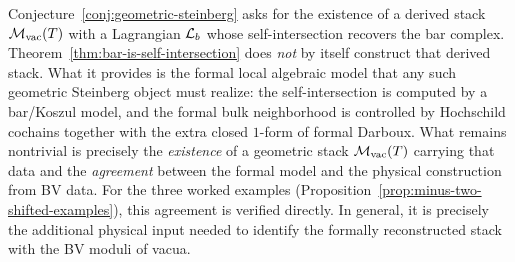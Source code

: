 \begin{remark}
\label{rem:conjecture-to-theorem}
Conjecture~\ref{conj:geometric-steinberg} asks for the existence of
a derived stack $\mathcal M_{\mathrm{vac}}(T)$ with a Lagrangian $\mathcal L_b$
whose self-intersection recovers the bar complex.
Theorem~\ref{thm:bar-is-self-intersection} does \emph{not} by itself
construct that derived stack. What it provides is the formal local
algebraic model that any such geometric Steinberg object must realize:
the self-intersection is computed by a bar/Koszul model, and the
formal bulk neighborhood is controlled by Hochschild cochains together
with the extra closed $1$-form of formal Darboux. What remains
nontrivial is precisely the \emph{existence} of a geometric stack
$\mathcal M_{\mathrm{vac}}(T)$ carrying that data and the \emph{agreement}
between the formal model and the physical construction from BV data.
For the three worked examples
(Proposition~\ref{prop:minus-two-shifted-examples}), this agreement
is verified directly. In general, it is precisely the additional
physical input needed to identify the formally reconstructed stack
with the BV moduli of vacua.
\end{remark}

